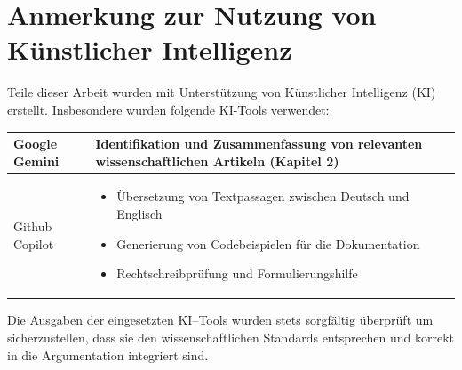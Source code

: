 \thispagestyle{empty}

\section*{Anmerkung zur Nutzung von Künstlicher Intelligenz}
\vspace*{2em}
Teile dieser Arbeit wurden mit Unterstützung von Künstlicher Intelligenz (KI) erstellt. Insbesondere wurden folgende KI-Tools verwendet:

\begin{table}[h]
    \centering
    \begin{tabular}{|m{}|m{}|}
        \toprule
        Google Gemini & Identifikation und Zusammenfassung von relevanten wissenschaftlichen Artikeln (Kapitel 2) \\
        \midrule
        Github Copilot & 
        \begin{itemize}[leftmargin=*]
            \item Übersetzung von Textpassagen zwischen Deutsch und Englisch
            \item Generierung von Codebeispielen für die Dokumentation
            \item Rechtschreibprüfung und Formulierungshilfe
        \end{itemize} \\
        \bottomrule
    \end{tabular}
\end{table}

Die Ausgaben der eingesetzten KI--Tools wurden stets sorgfältig überprüft um sicherzustellen, dass sie den wissenschaftlichen Standards entsprechen und korrekt in die Argumentation integriert sind.